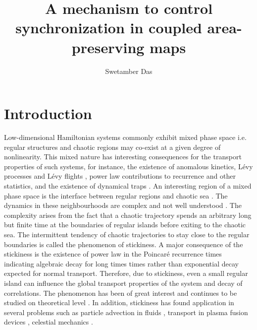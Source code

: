 \documentclass[preprint,showpacs,preprintnumbers,amsmath,amssymb]{revtex4-1}
\begin{document}
\title{A mechanism to control synchronization in coupled area-preserving maps}
\author{Swetamber Das}

\begin{abstract}
\end{abstract}
\maketitle

\section{Introduction} 
Low-dimensional Hamiltonian systems commonly exhibit mixed phase space i.e. regular structures and chaotic regions may co-exist at a given degree of nonlinearity. This mixed nature has interesting consequences for the transport properties of such systems, for instance, the existence of anomalous kinetics, L\'{e}vy processes and L\'{e}vy flights \cite{Klafter1994,Zaburdaev2015}, power law contributions to recurrence and other statistics, and the existence of dynamical traps \cite{Zaslavsky2002a,Zaslavsky2002b}. An interesting region of a mixed phase space is the interface between regular regions and chaotic sea \cite{Mackay1984, Easton1993}. The dynamics in these neighbourhoods are complex and not well understood \cite{Meiss2015}. The complexity arises from the fact that a chaotic trajectory spends an arbitrary long but finite time at the boundaries of regular islands before exiting to the chaotic sea. The intermittent tendency of chaotic trajectories to stay close to the regular boundaries is called the phenomenon of stickiness. A major consequence of the stickiness is  the existence of power law in the Poincar{\'e} recurrence times indicating algebraic decay for long times times rather than exponential decay expected for normal transport. Therefore, due to stickiness, even a small regular island can influence the global transport properties of the system and decay of correlations. The phenomenon has been of great interest and continues to be studied on theoretical level \cite{Altmann2006, Altmann2010,Livorati2012,Bunimovich2012, Kruger2015}. In addition, stickiness has found application in several problems such as particle advection in fluids \cite{Babiano1994,Tel2005}, transport in plasma fusion devices \cite{Szezech2012,Martins2014}, celestial mechanics \cite{Efthymiopoulos1999, Harsoula2010, Harsoula2016}.
\end{document}
